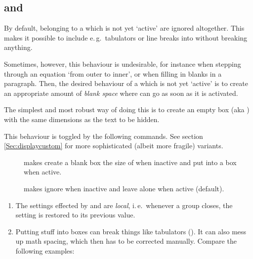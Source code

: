 \documentclass[12pt]{scrartcl}
\let\newslide=\relax
\begin{document}
    \newslide

  \subsection{ and }\label{Sec:boxedsteps}%
  By default,  belonging to a  which is not yet `active' are ignored altogether. This
  makes it possible to include e.\,g.\ tabulators \code{\&} or line breaks into  without breaking
  anything.

  Sometimes, however, this behaviour is undesirable, for instance when stepping through an equation `from outer to
  inner', or when filling in blanks in a paragraph. Then, the desired behaviour of a  which is not yet
  `active' is to create an appropriate amount of \emph{blank space} where  can go as soon as it is
  activated.

  \newslide

  The simplest and most robust way of doing this is to create an empty box (aka ) with the same
  dimensions as the text to be hidden.

  This behaviour is toggled by the following commands. See section \ref{Sec:displaycustom} for more sophisticated
  (albeit more fragile) variants.
  \begin{description}
  \item[] makes  create a blank box the size of  when
    inactive and put  into a box when active.
  \item[] makes  ignore  when inactive and leave
     alone when active (default).
  \end{description}

  \newslide

  \begin{enumerate}
  \item The settings effected by  and  are \emph{local}, i.\,e.\ whenever
    a group closes, the setting is restored to its previous value.

  \item Putting stuff into boxes can break things like tabulators (\code{\&}). It can also mess up math spacing, which
    then has to be corrected manually. Compare the following examples:

  \end{enumerate}
\end{document}
